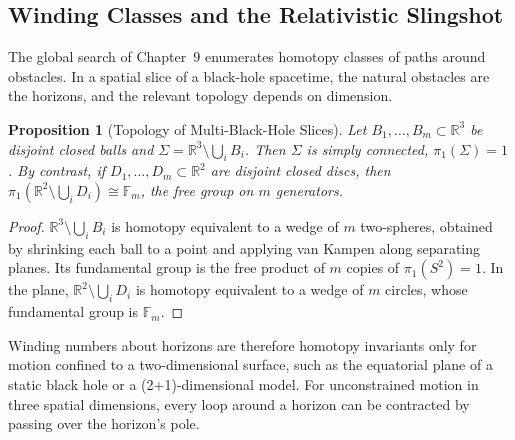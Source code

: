 \documentclass[11pt,reqno]{amsart}
\newtheorem{proposition}[theorem]{Proposition}
\theoremstyle{definition}
\providecommand{\R}{\mathbb{R}}
\numberwithin{equation}{section}
\providecommand{\R}{\mathbb{R}}
\begin{document}
\subsection{Winding Classes and the Relativistic Slingshot}
\label{subsec:relativistic_slingshot}
The global search of Chapter~9 enumerates homotopy classes of paths around obstacles. In a spatial slice of a black-hole spacetime, the natural obstacles are the horizons, and the relevant topology depends on dimension.

\begin{proposition}[Topology of Multi-Black-Hole Slices]
\label{prop:bh_topology}
Let $B_1, \dots, B_m \subset \R^3$ be disjoint closed balls and $\Sigma = \R^3 \setminus \bigcup_i B_i$. Then $\Sigma$ is simply connected, $\pi_1(\Sigma) = 1$. By contrast, if $D_1, \dots, D_m \subset \R^2$ are disjoint closed discs, then $\pi_1(\R^2 \setminus \bigcup_i D_i) \cong \mathbb{F}_m$, the free group on $m$ generators.
\end{proposition}
\begin{proof}
$\R^3 \setminus \bigcup_i B_i$ is homotopy equivalent to a wedge of $m$ two-spheres, obtained by shrinking each ball to a point and applying van Kampen along separating planes. Its fundamental group is the free product of $m$ copies of $\pi_1(S^2) = 1$. In the plane, $\R^2 \setminus \bigcup_i D_i$ is homotopy equivalent to a wedge of $m$ circles, whose fundamental group is $\mathbb{F}_m$.
\end{proof}

Winding numbers about horizons are therefore homotopy invariants only for motion confined to a two-dimensional surface, such as the equatorial plane of a static black hole or a (2+1)-dimensional model. For unconstrained motion in three spatial dimensions, every loop around a horizon can be contracted by passing over the horizon's pole.
\end{document}
